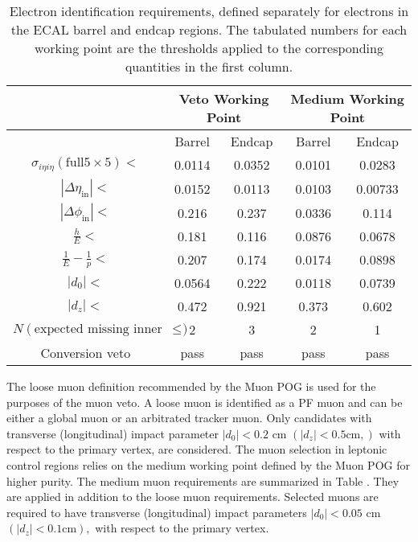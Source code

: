  \begin{table}
 \centering
 \begin{tabular}{|*{5}{c|}}
 \hline
 \multirow{2}{*}{} & \multicolumn{2}{c}{Veto Working Point} & \multicolumn{2}{c}{Medium Working Point} \\
 \hline
 & Barrel & Endcap & Barrel & Endcap \\
\hline
$\sigma_{i\eta i \eta} (\text{full} 5 \times 5) <$ & 0.0114 & 0.0352 & 0.0101 & 0.0283 \\
$|\Delta\eta_{\text{in}}|<$ & 0.0152 & 0.0113 & 0.0103 & 0.00733 \\
$|\Delta\phi_{\text{in}}|<$ & 0.216 & 0.237 & 0.0336 & 0.114 \\
$\frac{h}{E} <$ & 0.181 & 0.116 & 0.0876 & 0.0678 \\
$\frac{1}{E}-\frac{1}{p}<$ & 0.207 & 0.174 & 0.0174 & 0.0898 \\
$|d_0|<$ & 0.0564 & 0.222 & 0.0118 & 0.0739 \\
$|d_z|<$ & 0.472 & 0.921 & 0.373 & 0.602 \\
$N(\text{expected missing inner hits})\leq$ & 2 & 3 & 2 & 1 \\
Conversion veto & pass & pass & pass & pass \\
\hline
 \end{tabular}
 \caption{Electron identification requirements, defined separately for electrons in the ECAL barrel and endcap regions. The tabulated numbers for each working point are the thresholds applied to the corresponding quantities in the first column.}
 \label{ElectronID}
 \end{table}
 
 The loose muon definition recommended by the Muon POG is used for the purposes of the muon veto. A loose muon is identified as a PF muon and can be either a global muon or an arbitrated tracker muon. Only candidates with transverse (longitudinal) impact parameter $|d_0|<0.2$ cm $(|d_z|<0.5 \text{cm},)$ with respect to the primary vertex, are considered. The muon selection in leptonic control regions relies on the medium working point defined by the Muon POG for higher purity. The medium muon requirements are summarized in Table . They are applied in addition to the loose muon requirements. Selected muons are required to have transverse (longitudinal) impact parameters $|d_0|<0.05$ cm $(|d_z|<0.1 \text{cm}),$ with respect to the primary vertex. 

